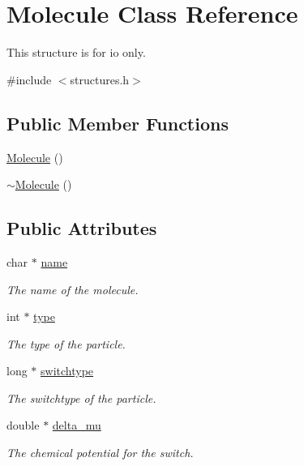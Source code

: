 \hypertarget{class_molecule}{\section{Molecule Class Reference}
\label{class_molecule}
}


This structure is for io only.  




{\ttfamily \#include $<$structures.\+h$>$}

\subsection*{Public Member Functions}
\begin{DoxyCompactItemize}
\item 
\hyperlink{class_molecule_a7e7d290ae641518ad4c4d5303b519d0f}{Molecule} ()
\item 
\hyperlink{class_molecule_a1ff980b574a62526abff3d631c83bf94}{$\sim$\+Molecule} ()
\end{DoxyCompactItemize}
\subsection*{Public Attributes}
\begin{DoxyCompactItemize}
\item 
char $\ast$ \hyperlink{class_molecule_a905da45fb2ad1c821b7cf03c655c3047}{name}
\begin{DoxyCompactList}\small\item\em The name of the molecule. \end{DoxyCompactList}\item 
int $\ast$ \hyperlink{class_molecule_aa968965732a78fc8b2b60fc27d6374b6}{type}
\begin{DoxyCompactList}\small\item\em The type of the particle. \end{DoxyCompactList}\item 
long $\ast$ \hyperlink{class_molecule_acf6cf0f43a015cff8dde7970e1ca3abd}{switchtype}
\begin{DoxyCompactList}\small\item\em The switchtype of the particle. \end{DoxyCompactList}\item 
double $\ast$ \hyperlink{class_molecule_a6fd83a87d28a34e7098dc9d9f22b6c41}{delta\+\_\+mu}
\begin{DoxyCompactList}\small\item\em The chemical potential for the switch. \end{DoxyCompactList}\end{DoxyCompactItemize}


